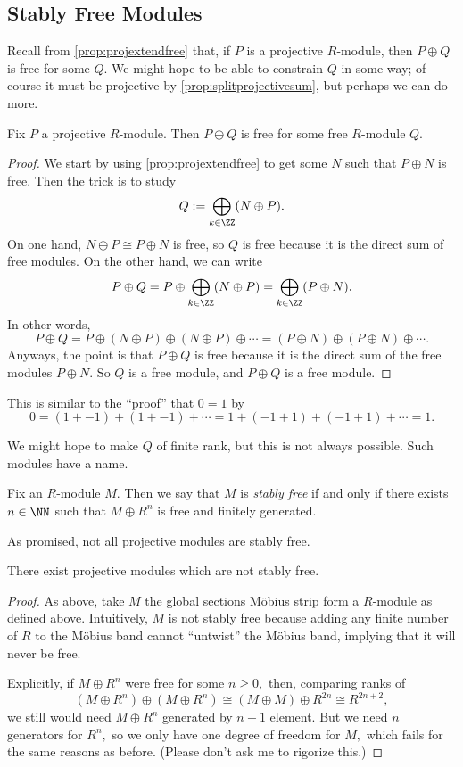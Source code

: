 \subsection{Stably Free Modules}
Recall from \autoref{prop:projextendfree} that, if $P$ is a projective $R$-module, then $P\oplus Q$ is free for some $Q.$ We might hope to be able to constrain $Q$ in some way; of course it must be projective by \autoref{prop:splitprojectivesum}, but perhaps we can do more.
\begin{proposition}
	Fix $P$ a projective $R$-module. Then $P\oplus Q$ is free for some free $R$-module $Q.$
\end{proposition}
\begin{proof}
	We start by using \autoref{prop:projextendfree} to get some $N$ such that $P\oplus N$ is free. Then the trick is to study
	\[Q:=\bigoplus_{k\in\ZZ}(N\oplus P).\]
	On one hand, $N\oplus P\cong P\oplus N$ is free, so $Q$ is free because it is the direct sum of free modules. On the other hand, we can write
	\[P\oplus Q=P\oplus\bigoplus_{k\in\ZZ}(N\oplus P)=\bigoplus_{k\in\ZZ}(P\oplus N).\]
	In other words,
	\[P\oplus Q=P\oplus(N\oplus P)\oplus(N\oplus P)\oplus\cdots=(P\oplus N)\oplus(P\oplus N)\oplus\cdots.\]
	Anyways, the point is that $P\oplus Q$ is free because it is the direct sum of the free modules $P\oplus N.$ So $Q$ is a free module, and $P\oplus Q$ is a free module.
\end{proof}
\begin{remark}
	This is similar to the ``proof'' that $0=1$ by
	\[0=(1+-1)+(1+-1)+\cdots=1+(-1+1)+(-1+1)+\cdots=1.\]
\end{remark}
We might hope to make $Q$ of finite rank, but this is not always possible. Such modules have a name.
\begin{definition}
	Fix an $R$-module $M.$ Then we say that $M$ is \textit{stably free} if and only if there exists $n\in\NN$ such that $M\oplus R^n$ is free and finitely generated.
\end{definition}
As promised, not all projective modules are stably free.
\begin{proposition}
	There exist projective modules which are not stably free.
\end{proposition}
\begin{proof}
	As above, take $M$ the global sections M\"obius strip form a $R$-module as defined above. Intuitively, $M$ is not stably free because adding any finite number of $R$ to the M\"obius band cannot ``untwist'' the M\"obius band, implying that it will never be free.
	
	Explicitly, if $M\oplus R^n$ were free for some $n\ge0,$ then, comparing ranks of
	\[\left(M\oplus R^n\right)\oplus \left(M\oplus R^n\right)\cong(M\oplus M)\oplus R^{2n}\cong R^{2n+2},\]
	we still would need $M\oplus R^n$ generated by $n+1$ element. But we need $n$ generators for $R^n,$ so we only have one degree of freedom for $M,$ which fails for the same reasons as before. (Please don't ask me to rigorize this.)
\end{proof}
